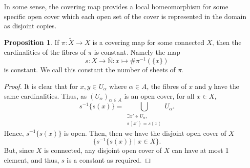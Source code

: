 \documentclass[]{article}
\theoremstyle{definition}
\theoremstyle{definition}
\newtheorem{proposition}{Proposition}[section]
\begin{document}
In some sense, the covering map provides a local homeomorphism for some specific 
open cover which each open set of the cover is represented in the domain as disjoint 
copies. 

\begin{proposition}
  If \(\pi : \tilde X \to X\) is a covering map for some connected \(X\), then 
  the cardinalities of the fibres of \(\pi\) is constant. Namely the map
  \[s : X \to \overline{\mathbb{N}} : x \mapsto \# \pi^{-1}(\{x\})\]
  is constant. We call this constant the number of sheets of \(\pi\).
\end{proposition}
\begin{proof}
  It is clear that for \(x, y \in U_\alpha\) where \(\alpha \in A\), the fibres of 
  \(x\) and \(y\) have the same cardinalities. Thus, as \((U_\alpha)_{\alpha \in A}\) is 
  an open cover, for all \(x \in X\),
  \[s^{-1}\{s(x)\} = \bigcup_{\substack{\exists x' \in U_\alpha, \\s(x') = s(x)}} U_\alpha.\] 
  Hence, \(s^{-1}\{s(x)\}\) is open. Then, then we have the disjoint open cover of \(X\)
  \[\{s^{-1}\{s(x)\} \mid x \in X\}.\]
  But, since \(X\) is connected, any disjoint open cover of \(X\) can have at most 1 
  element, and thus, \(s\) is a constant as required.
\end{proof}
\end{document}
